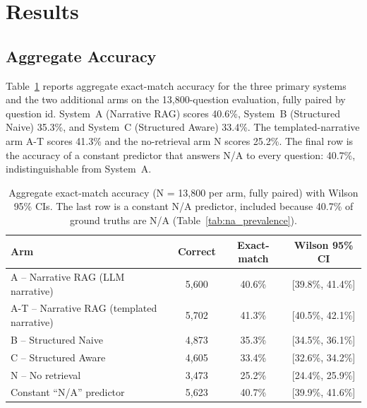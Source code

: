 
\section{Results}
\label{sec:results}

\subsection{Aggregate Accuracy}
\label{sec:results:overall}

Table~\ref{tab:main_results} reports aggregate exact-match accuracy for the three primary
systems and the two additional arms on the 13,800-question evaluation, fully paired by
question id.  System~A (Narrative RAG) scores 40.6\%, System~B (Structured Naive) 35.3\%,
and System~C (Structured Aware) 33.4\%.  The templated-narrative arm A-T scores 41.3\%
and the no-retrieval arm N scores 25.2\%.  The final row is the accuracy of a constant
predictor that answers N/A to every question: 40.7\%, indistinguishable from System~A.

\begin{table}[htbp]
\centering
\caption{Aggregate exact-match accuracy (N = 13,800 per arm, fully paired) with Wilson
95\% CIs.  The last row is a constant N/A predictor, included because 40.7\% of ground
truths are N/A (Table~\ref{tab:na_prevalence}).}
\label{tab:main_results}
\begin{tabular}{lccc}
\toprule
Arm & Correct & Exact-match & Wilson 95\% CI \\
\midrule
A -- Narrative RAG (LLM narrative)       & 5,600 & 40.6\% & [39.8\%, 41.4\%] \\
A-T -- Narrative RAG (templated narrative) & 5,702 & 41.3\% & [40.5\%, 42.1\%] \\
B -- Structured Naive                    & 4,873 & 35.3\% & [34.5\%, 36.1\%] \\
C -- Structured Aware                    & 4,605 & 33.4\% & [32.6\%, 34.2\%] \\
N -- No retrieval                        & 3,473 & 25.2\% & [24.4\%, 25.9\%] \\
\midrule
Constant ``N/A'' predictor               & 5,623 & 40.7\% & [39.9\%, 41.6\%] \\
\bottomrule
\end{tabular}
\end{table}

